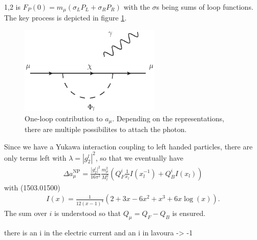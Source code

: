 \documentclass[11pt,a4paper,twoside]{article}
\numberwithin{equation}{section}
\begin{document}
\begin{spacing}{1,2}
is $F_P(0) =m_\mu\left( \sigma_L P_L + \sigma_R P_R\right)$ with the $\sigma$s being sums of loop functions. The key process is depicted in figure \ref{pic_g-2}.
\begin{figure}[t]
 \includegraphics[width=0.6\textwidth]{../pics/g-2.eps}
 \caption{One-loop contribution to $a_\mu$. Depending on the representations, there are multiple possibilites to attach the photon.}
 \label{pic_g-2}
\end{figure}
Since we have a Yukawa interaction coupling to left handed particles, there are only terms left with $\lambda=|g_2^l|^2$, so that we eventually have
\begin{align}
 \Delta a_\mu^\text{NP} = \frac{|{g_2^l}|^2}{16\pi^2}\frac{m_\mu^2}{M_l^2}\left(Q^i_F \frac{1}{x_l}I(x_l^{-1}) + Q^i_B  I(x_l)\right)
\end{align}
with (1503.01500)
\begin{align}
 I(x) = \frac{1}{12(x-1)^4}\left(2+3x-6x^2+x^3+6x\log(x) \right).
\end{align}
The sum over $i$ is understood so that $Q_\mu = Q_F-Q_B$ is ensured.

there is an i in the electric current and an i in lavoura -> -1



\end{spacing}
\end{document}

